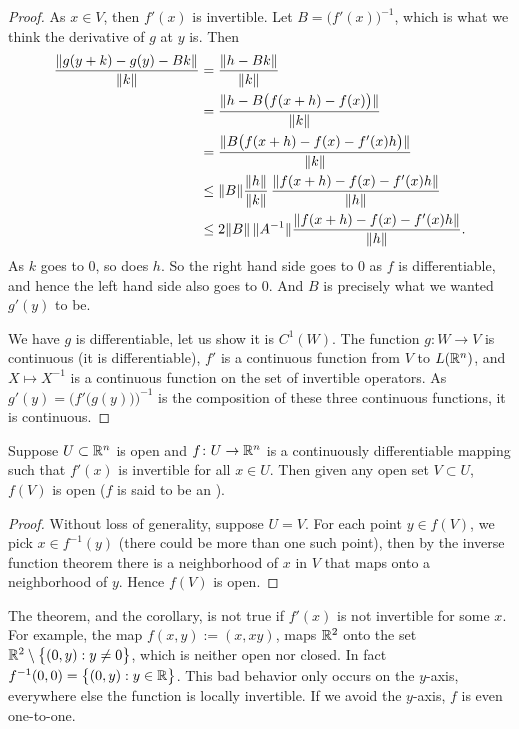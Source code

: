 \begin{proof}
As $x \in V$, then $f'(x)$ is invertible.
Let $B = \bigl(f'(x)\bigr)^{-1}$, which is what we think the derivative of
$g$ at $y$ is.  Then
\begin{equation*}
\begin{split}
\frac{\lVert {g(y+k)-g(y)-Bk} \rVert}{\lVert {k} \rVert}
& =
\frac{\lVert {h-Bk} \rVert}{\lVert {k} \rVert}
\\
& =
\frac{\lVert {h-B\bigl(f(x+h)-f(x)\bigr)} \rVert}{\lVert {k} \rVert}
\\
& =
\frac{\lVert {B\bigl(f(x+h)-f(x)-f'(x)h\bigr)} \rVert}{\lVert {k} \rVert}
\\
& \leq
\lVert {B} \rVert
\frac{\lVert {h} \rVert}{\lVert {k} \rVert}\,
\frac{\lVert {f(x+h)-f(x)-f'(x)h} \rVert}{\lVert {h} \rVert}
\\
& \leq
2\lVert {B} \rVert \, \lVert {A^{-1}} \rVert
\frac{\lVert {f(x+h)-f(x)-f'(x)h} \rVert}{\lVert {h} \rVert} .
\end{split}
\end{equation*}
As $k$ goes to 0, so does $h$.  So the right hand side goes to 0 as $f$ is
differentiable, and hence
the left hand side also goes to 0.  And
$B$ is precisely what we wanted $g'(y)$ to be.

We have $g$ is differentiable, let us show it is $C^1(W)$.
The function $g \colon W \to V$ is continuous (it is differentiable),
$f'$ is a continuous function from $V$
to $L({\mathbb{R}}^n)$, and $X \mapsto X^{-1}$ is a continuous function on
the set of invertible operators.
As
$g'(y) = {\bigl( f'\bigl(g(y)\bigr)\bigr)}^{-1}$ is the composition
of these three
continuous functions, it is continuous.
\end{proof}

\begin{cor}
Suppose $U \subset {\mathbb{R}}^n$ is open and $f \colon U \to {\mathbb{R}}^n$ is a continuously
differentiable mapping such that $f'(x)$ is invertible for all $x \in U$.  Then
given any open set $V \subset U$, $f(V)$ is open ($f$ is said to be an
\emph{}).
\end{cor}

\begin{proof}
Without loss of generality, suppose $U=V$.
For each point $y \in f(V)$, we pick $x \in f^{-1}(y)$ (there could be more
than one such point), then by the inverse function theorem there is a
neighborhood of $x$ in $V$ that maps onto a neighborhood of $y$.  Hence
$f(V)$ is open.
\end{proof}

\begin{example}
The theorem, and the corollary, is not true if $f'(x)$ is not invertible for
some $x$.  For example,
the map $f(x,y) := (x,xy)$, maps ${\mathbb{R}}^2$ onto the set
${\mathbb{R}}^2 \setminus \bigl\{ (0,y) : y \neq 0 \bigr\}$, which is neither open nor closed.
In fact $f^{-1}(0,0) = \bigl\{ (0,y) : y \in {\mathbb{R}} \bigr\}$.  This bad behavior
only occurs on the $y$-axis, everywhere else the function is locally
invertible.  If we avoid the $y$-axis, $f$ is even one-to-one.
\end{example}

